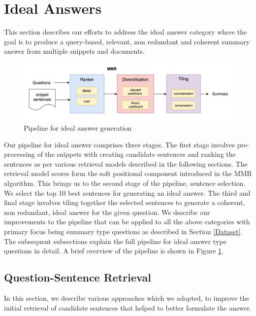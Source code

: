 \documentclass[11pt,a4paper]{article}
\begin{document}
\section{Ideal Answers}
\label{approach1}
This section describes our efforts to address the ideal answer category where the goal is to produce a query-based, relevant, non redundant and coherent summary answer from multiple snippets and documents. 

 \begin{figure}
     \centering
     \includegraphics[scale=0.6]{images/pipeline_summary.png}
     \caption{Pipeline for ideal answer generation}
     \label{fig:ideal_answers_pipeline}
 \end{figure}

Our pipeline for ideal answer comprises three stages. The first stage involves pre-processing of the snippets with creating candidate sentences and ranking the sentences as per various retrieval models described in the following sections. The retrieval model scores form the soft positional component introduced in the MMR algorithm. This brings us to the second stage of the pipeline, sentence selection. We select the top 10 best sentences for generating an ideal answer. The third and final stage involves tiling together the selected sentences to generate a coherent, non redundant, ideal answer for the given question. %
 We describe our improvements to the pipeline that can be applied to all the above categories with primary focus being summary type questions as described in Section \ref{Dataset}.
The subsequent subsections explain the full pipeline for ideal answer type questions in detail. A brief overview of the pipeline is shown in Figure \ref{fig:ideal_answers_pipeline}.



\subsection{Question-Sentence Retrieval}
In this section, we describe various approaches which we adapted, to improve the initial retrieval of candidate sentences that helped to better formulate the answer.
\end{document}
